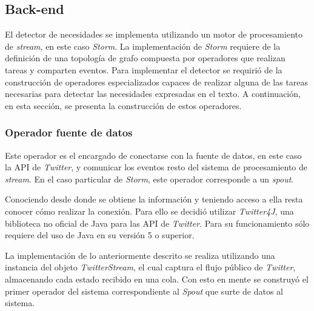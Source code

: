 \subsection{Back-end}
\label{subsec:detectorNecesidades}

El detector de necesidades se implementa utilizando un motor de procesamiento de \textit{stream}, en este caso \textit{Storm}. La implementación de \textit{Storm} requiere de la definición de una topología de grafo compuesta por operadores que realizan tareas y comparten eventos. Para implementar el detector se requirió de la construcción de operadores especializados capaces de realizar alguna de las tareas necesarias para detectar las necesidades expresadas en el texto. A continuación, en esta sección, se presenta la construcción de estos operadores.

\subsubsection*{Operador fuente de datos}
\label{subsubseC:EntradaDeDatos}

Este operador es el encargado de conectarse con la fuente de datos, en este caso la API de \textit{Twitter}, y comunicar los eventos resto del sistema de procesamiento de \textit{stream}. En el caso particular de \textit{Storm}, este operador corresponde a un \textit{spout}.

Conociendo desde donde se obtiene la información y teniendo acceso a ella resta conocer cómo realizar la conexión. Para ello se decidió utilizar \textit{Twitter4J}, una biblioteca no oficial de Java para las API de \textit{Twitter}. Para su funcionamiento sólo requiere del uso de Java en su versión 5 o superior.

La implementación de lo anteriormente descrito se realiza utilizando una instancia del objeto \textit{TwitterStream}, el cual captura el flujo público de \textit{Twitter}, almacenando cada estado recibido en una cola. Con esto en mente se construyó el primer operador del sistema correspondiente al \textit{Spout} que surte de datos al sistema.

